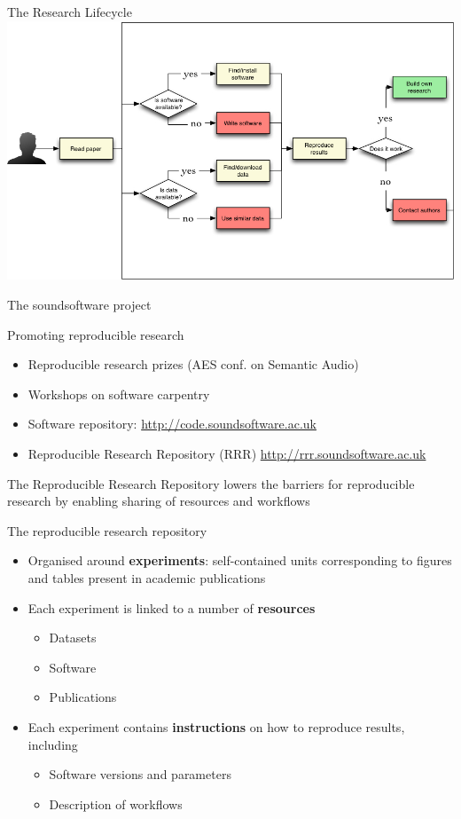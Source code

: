 \documentclass[10pt]{beamer}
\begin{document}
\begin{frame}{The Research Lifecycle}
\includegraphics[width=\linewidth]{./images/research-lifecycle.jpg}
\end{frame}

\begin{frame}{The soundsoftware project}
\begin{block}{Promoting reproducible research}
\begin{itemize}
\item Reproducible research prizes (AES conf. on Semantic Audio)
\item Workshops on software carpentry
\item Software repository: \url{http://code.soundsoftware.ac.uk}
\item Reproducible Research Repository (RRR) \url{http://rrr.soundsoftware.ac.uk}
\end{itemize}
\end{block}

The Reproducible Research Repository lowers the barriers for reproducible research by enabling sharing of resources and workflows
\end{frame}

\begin{frame}{The reproducible research repository}
\begin{block}{}
\begin{itemize}
\item Organised around \textbf{experiments}: self-contained units corresponding to figures and tables present in academic publications
\item Each experiment is linked to a number of \textbf{resources} 
\begin{itemize}
\item Datasets
\item Software
\item Publications
\end{itemize}
\item Each experiment contains \textbf{instructions} on how to reproduce results, including
\begin{itemize}
\item Software versions and parameters
\item Description of workflows
\end{itemize}
\end{itemize}
\end{block}
\end{frame}
\end{document}
